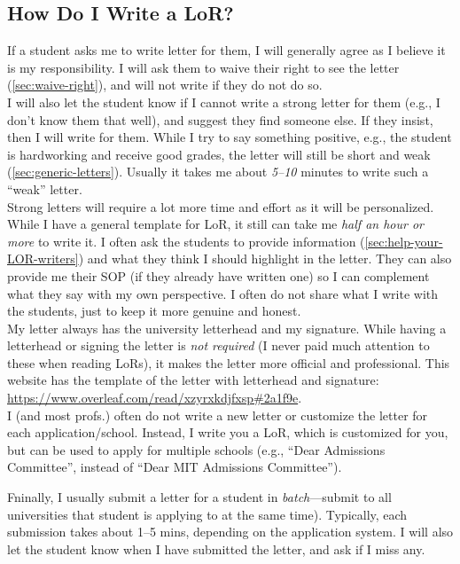\documentclass[oneside,11pt]{book}
\newenvironment{commentbox}[1][]{
  \small
  \begin{marker}[\faChessPawn{}]
    {\textbf{#1}}
  }{
  \end{marker}
}
\begin{document}
\subsection{How Do I Write a LoR?}\label{sec:lor-writing}
\begin{commentbox}
  
If a student asks me to write letter for them, I will generally agree as I believe it is my responsibility. I will ask them to waive their right to see the letter (\autoref{sec:waive-right}), and will not write if they do not do so.\\

I will also let the student know if I cannot write a strong letter for them (e.g., I don't know them that well), and suggest they find someone else.  If they insist, then I will write for them. While I try to say something positive, e.g., the student is hardworking and receive good grades, the letter will still be short and weak (\autoref{sec:generic-letters}). Usually it takes me about \emph{5--10} minutes to write such a ``weak'' letter.\\

Strong letters will require a lot more time and effort as it will be personalized.  While I have a general template for LoR, it still can take me \emph{half an hour or more} to write it.  I often ask the students to provide information (\autoref{sec:help-your-LOR-writers}) and what they think I should highlight in the letter. They can also provide me their SOP (if they already have written one) so I can complement what they say with my own perspective.  I often do not share what I write with the students, just to keep it more genuine and honest.\\

My letter always has the university letterhead and my signature.  While having a letterhead or signing the letter is \emph{not required} (I never paid much attention to these when reading LoRs), it makes the letter more official and professional.  
This website has the template of the letter with letterhead and signature: \url{https://www.overleaf.com/read/xzyrxkdjfxsp#2a1f9e}.\\

I (and most profs.) often do not write a new letter or customize the letter for each application/school. Instead, I write you a LoR, which is customized for you, but can be used to apply for multiple schools (e.g., ``Dear Admissions Committee'', instead of ``Dear MIT Admissions Committee'').

Fninally, I usually submit a letter for a student in \emph{batch}---submit to all universities that student is applying to at the same time). Typically, each submission takes about 1--5 mins, depending on the application system.  I will also let the student know when I have submitted the letter, and ask if I miss any.\\

\end{commentbox}
\end{document}
